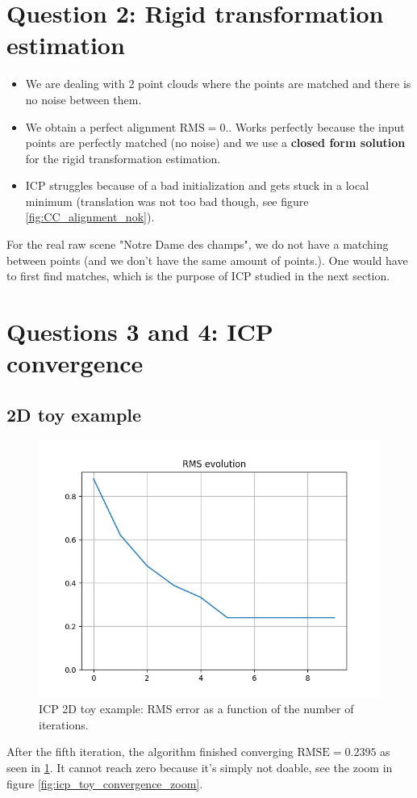 \documentclass[a4paper]{article}
\begin{document}
\pagebreak

\section*{Question 2: Rigid transformation estimation}
\begin{itemize}
  \item We are dealing with 2 point clouds where the points are matched and there is no noise between them.
  \item We obtain a perfect alignment $\text{RMS} = 0.$.
Works perfectly because the input points are perfectly matched (no noise) and we use a \textbf{closed form solution} for the rigid transformation estimation.
  \item ICP struggles because of a bad initialization and gets stuck in a local minimum (translation was not too bad though, see figure \ref{fig:CC_alignment_nok}).
\end{itemize}


For the real raw scene "Notre Dame des champs", we do not have a matching between points (and we don't have the same amount of points.). One would have to first find matches, which is the purpose of ICP studied in the next section.

\pagebreak
\section*{Questions 3 and 4: ICP convergence}
\subsection*{2D toy example}
\begin{figure}[ht]
  \centering
  \includegraphics[width=0.4\linewidth]{figures/icp_2d_toy_example.png}
  \caption{ICP 2D toy example:  RMS error as a function of the number of iterations.}
  \label{fig:icp_toy_convergence}
\end{figure}


After the fifth iteration, the algorithm finished converging $\text{RMSE} = 0.2395$ as seen in \ref{fig:icp_toy_convergence}. It cannot reach zero because it's simply not doable, see the zoom in figure \ref{fig:icp_toy_convergence_zoom}.
\end{document}
